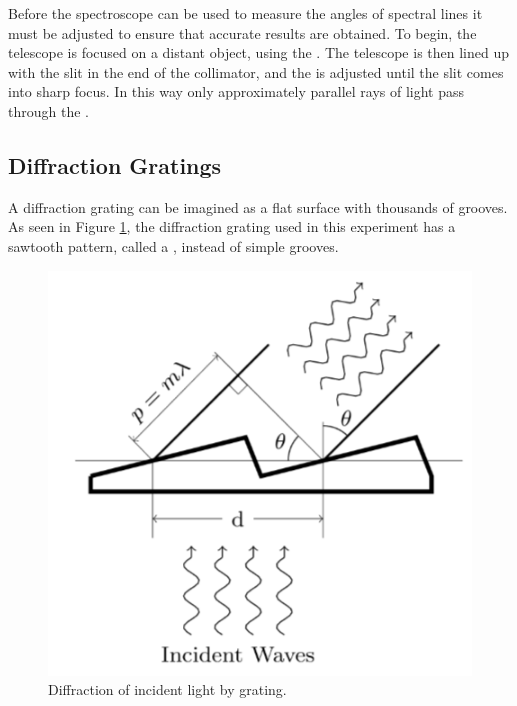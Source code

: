 \noindent Before the spectroscope can be used to measure the angles of spectral lines it must be adjusted to ensure that accurate results are obtained. To begin, the telescope is focused on a distant object, using the . The telescope is then lined up with the slit in the end of the collimator, and the  is adjusted until the slit comes into sharp focus. In this way only approximately parallel rays of light pass through the .

\subsection{Diffraction Gratings}

A diffraction grating can be imagined as a flat surface with thousands of grooves. As seen in Figure \ref{fig:SPEC3}, the diffraction grating used in this experiment has a sawtooth pattern, called a , instead of simple grooves.

\begin{figure}[H]
    \centering
    \includegraphics[scale = 0.8]{Images/SPEC3.PNG}
    \caption{Diffraction of incident light by grating.}
    \label{fig:SPEC3}
\end{figure}


